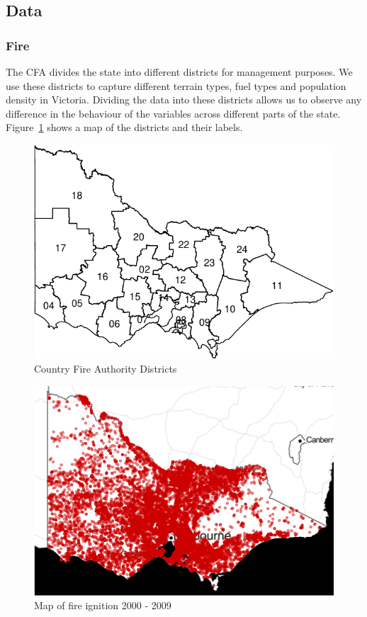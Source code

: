 \documentclass[11pt,a4paper]{article}
\begin{document}
\subsection{Data}

\subsubsection{Fire}

The CFA divides the state into different districts for management purposes. We use these districts to capture different terrain types, fuel types and population density in Victoria. Dividing the data into these districts allows us to observe any difference in the behaviour of the variables across different parts of the state. Figure~\ref{fig:dist} shows a map of the districts and their labels.

\begin{figure}
  \centering
  \includegraphics[width=.7\textwidth]{figures/cfadis.pdf}
  \caption{Country Fire Authority Districts}
  \label{fig:dist}
\end{figure}



\begin{figure}
  \centering
  \includegraphics[width=.8\textwidth]{figures/firemap.pdf}
  \caption{Map of fire ignition 2000 - 2009}
  \label{fig:firemap}
\end{figure}
\end{document}
